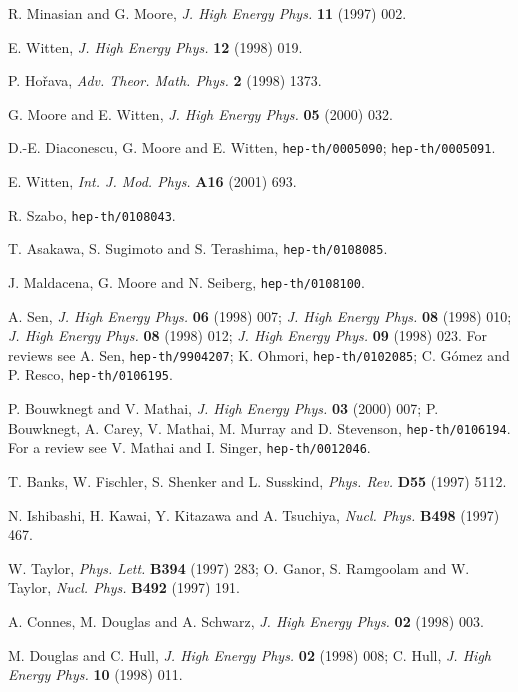 \documentclass[a4paper,a4paper]{article}
\begin{document}
\begin{thebibliography}{99}  
 
R. Minasian and G. Moore, {\it J. High Energy Phys.} {\bf 11} (1997) 002.   
  
E. Witten, {\it J. High Energy Phys.} {\bf 12} (1998) 019.  

P. Ho\v rava, {\it Adv. Theor. Math. Phys.} {\bf 2} (1998) 1373.
  
G. Moore and E. Witten, {\it J. High Energy Phys.} {\bf 05} (2000) 032.

D.-E. Diaconescu, G. Moore and E. Witten, {\tt hep-th/0005090}; {\tt hep-th/0005091}.   
  
E. Witten, {\it Int. J. Mod. Phys.} {\bf A16} (2001) 693. 

R. Szabo, {\tt hep-th/0108043}.

T. Asakawa, S. Sugimoto and S. Terashima, {\tt hep-th/0108085}.

J. Maldacena, G. Moore and N. Seiberg, {\tt hep-th/0108100}.
 
A. Sen, 
{\it J. High Energy Phys.} {\bf 06} (1998) 007; 
{\it J. High Energy Phys.} {\bf 08} (1998) 010;   
{\it J. High Energy Phys.} {\bf 08} (1998) 012; 
{\it J. High Energy Phys.} {\bf 09} (1998) 023.  
For reviews see A. Sen, {\tt hep-th/9904207}; K. Ohmori, {\tt hep-th/0102085};
C. G\'omez and P. Resco, {\tt hep-th/0106195}.

P. Bouwknegt and V. Mathai,  {\it J. High Energy Phys.} {\bf 03} (2000) 007;
P. Bouwknegt, A. Carey, V. Mathai, M. Murray and D. Stevenson, 
{\tt hep-th/0106194}.  For a review see V. Mathai and I. Singer, 
{\tt hep-th/0012046}.
 
T. Banks, W. Fischler, S. Shenker and L. Susskind,  {\it Phys. Rev.} {\bf D55} (1997) 5112.  
  
N. Ishibashi, H. Kawai, Y. Kitazawa and A. Tsuchiya, {\it Nucl. Phys.} {\bf B498} (1997) 467.  
 
W. Taylor, {\it Phys. Lett.} {\bf B394} (1997) 283;  
O. Ganor, S. Ramgoolam and W. Taylor, {\it Nucl. Phys.} {\bf B492} (1997) 191.  
 
A. Connes, M. Douglas and A. Schwarz, {\it J. High Energy Phys.} {\bf 02} 
(1998) 003.  
  
M. Douglas and C. Hull, {\it J. High Energy Phys.} {\bf 02} (1998) 008;   
C. Hull, {\it J. High Energy Phys.} {\bf 10} (1998) 011.  
 

\end{thebibliography}
\end{document}
